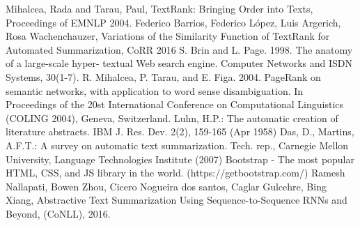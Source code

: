 \documentclass[twoside,twocolumn]{article}
\begin{document}



\begin{thebibliography}{99}

 Mihalcea, Rada  and  Tarau, Paul, TextRank: Bringing Order into Texts, Proceedings of EMNLP 2004.
 Federico Barrios, Federico L{\'{o}}pez, Luis Argerich, Rosa Wachenchauzer, Variations of the Similarity Function of TextRank for Automated Summarization, CoRR 2016
 S. Brin and L. Page. 1998. The anatomy of a large-scale hyper- textual Web search engine. Computer Networks and ISDN Systems, 30(1-7).
 R. Mihalcea, P. Tarau, and E. Figa. 2004. PageRank on semantic networks, with application to word sense disambiguation. In Proceedings of the 20st International Conference on Computational Linguistics (COLING 2004), Geneva, Switzerland.
 Luhn, H.P.: The automatic creation of literature abstracts. IBM J. Res. Dev. 2(2), 159-165 (Apr 1958)
 Das, D., Martins, A.F.T.: A survey on automatic text summarization. Tech. rep., Carnegie Mellon University, Language Technologies Institute (2007)
 Bootstrap - The most popular HTML, CSS, and JS library in the world. (https://getbootstrap.com/)
 Ramesh Nallapati, Bowen Zhou, Cicero Nogueira dos santos, Caglar Gulcehre, Bing Xiang, Abstractive Text Summarization Using Sequence-to-Sequence RNNs and Beyond, (CoNLL), 2016.

\end{thebibliography}



\end{document}
